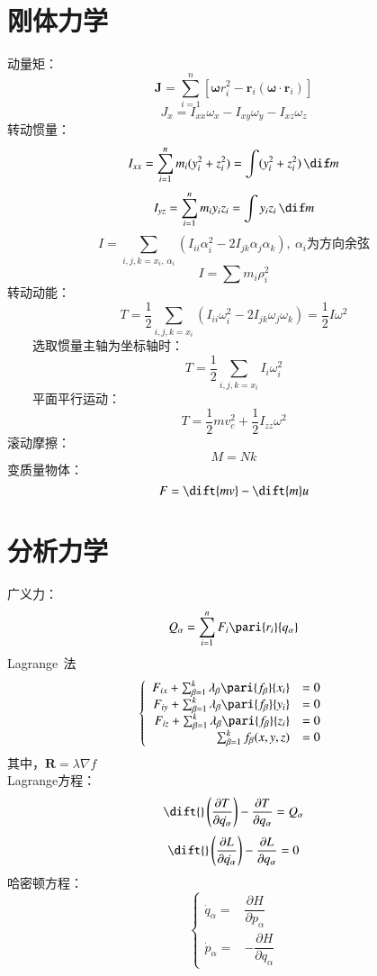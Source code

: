 \documentclass[UTF8,9pt]{ctexart}
\begin{document}
    \section{刚体力学}
        动量矩：
        $$\bm{J}=\sum_{i=1}^n\left[\bm{\omega}r_i^2-\bm{r}_i(\bm{\omega\cdot r}_i)\right]$$
        $$J_x=I_{xx}\omega_x-I_{xy}\omega_y-I_{xz}\omega_z$$
        转动惯量：
        $$I_{xx}=\sum_{i=1}^nm_i(y_i^2+z_i^2)=\int(y_i^2+z_i^2)\,\dif m$$
        $$I_{yz}=\sum_{i=1}^nm_iy_iz_i=\int y_iz_i\,\dif m$$
        $$I=\sum_{i,j,k=x_i,\,\alpha_i}\left(  I_{ii}\alpha_i^2-2I_{jk}\alpha_j\alpha_k\right),\  \alpha_i\text{为方向余弦}$$
        $$I=\sum m_i\rho_i^2$$
        转动动能：
        $$T=\frac{1}{2}\sum_{i,j,k=x_i}\left(I_{ii}\omega_i^2-2I_{jk}\omega_j\omega_k\right)=\frac{1}{2}I\omega^2$$
        $\qquad$选取惯量主轴为坐标轴时：
        $$T=\frac{1}{2}\sum_{i,j,k=x_i}I_{i}\omega_i^2$$
        $\qquad$平面平行运动：
        $$T=\frac{1}{2}mv^2_c+\frac{1}{2}I_{zz}\omega^2$$
        滚动摩擦：
        $$M=Nk$$
        变质量物体：
        $$F=\dift{mv}-\dift{m} u$$
    \section{分析力学}
        广义力：
        $$Q_\alpha=\sum_{i=1}^n F_i\pari{r_i}{q_\alpha}$$
        Lagrange{🍊}\,法
        $$\left\{\begin{array}{rl}
            F_{ix}+\sum_{\beta=1}^k\lambda_\beta\pari{f_\beta}{x_i}&=0\\
            F_{iy}+\sum_{\beta=1}^k\lambda_\beta\pari{f_\beta}{y_i}&=0\\
            F_{iz}+\sum_{\beta=1}^k\lambda_\beta\pari{f_\beta}{z_i}&=0\\
            \sum_{\beta=1}^kf_\beta(x,y,z)&=0
        \end{array}\right.$$
        其中，$\bm{R}=\lambda\nabla f$\\
        Lagrange方程：
        $$\dift{}\left(\frac{\partial T}{\partial \dot{q_{\alpha}}}\right)-\frac{\partial T}{\partial q_{\alpha}}=Q_{\alpha}$$
        $$\dift{}\left(\frac{\partial L}{\partial \dot{q_{\alpha}}}\right)-\frac{\partial L}{\partial q_{\alpha}}=0$$
        哈密顿方程：  
        $$\left\{\begin{array}{rr}
            \dot{q}_{\alpha}=&\dfrac{\partial H}{\partial p_{\alpha}} \\
            \dot{p}_{\alpha}=&-\dfrac{\partial H}{\partial q_{\alpha}}
        \end{array}\right.$$
\end{document}
